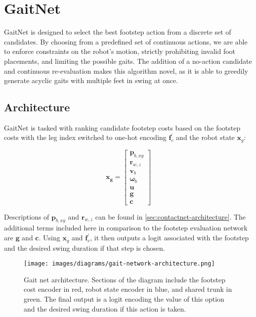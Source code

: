 \section{GaitNet}

GaitNet is designed to select the best footstep action from a discrete
set of candidates. By choosing from a predefined set of continuous actions,
we are able to enforce constraints on the robot's motion, strictly
prohibiting invalid foot placements, and limiting the possible gaits. The
addition of a no-action candidate and continuous re-evaluation makes this
algorithm novel, as it is able to greedily generate acyclic gaits with multiple
feet in swing at once.

\subsection{Architecture}

GaitNet is tasked with ranking candidate footstep costs based on the
footstep costs with the leg index switched to one-hot encoding
$\mathbf f_c^{\prime}$ and the robot state $\mathbf x_g$:

\[
  \mathbf{x_g} =
  \begin{bmatrix}
    \mathbf p_{b,xy} \\
    \mathbf r_{w,z} \\
    \mathbf v_b \\
    \mathbf \omega_b \\
    \mathbf u \\
    \mathbf g \\
    \mathbf c
  \end{bmatrix}
\]

Descriptions of $\mathbf p_{b,xy}$ and $\mathbf r_{w,z}$ can be found in
\autoref{sec:contactnet-architecture}. The additional terms included
here in comparison to the footstep evaluation network are
$\mathbf g$ and $\mathbf c$. Using $\mathbf x_g$ and $\mathbf f_c^{\prime}$,
it then outputs a logit associated with the footstep and the desired swing
duration if that step is chosen.

\begin{figure}[H]
  \centering
  \texttt{[image: images/diagrams/gait-network-architecture.png]}
  \caption{Gait net architecture. Sections of the diagram include the
    footstep cost encoder in red,
    robot state encoder in blue, and shared trunk in green.
    The final output is a logit encoding the value of this option and the
  desired swing duration if this action is taken.}
  \label{fig:diagram-gaitnet-architecture}
\end{figure}

